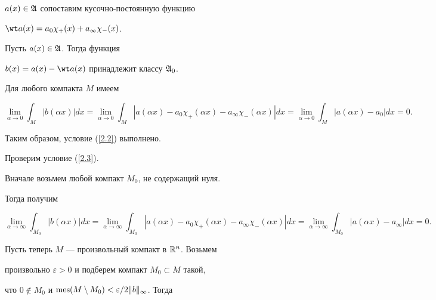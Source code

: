 $a(x)\in\frak A$ сопоставим кусочно-постоянную функцию


$\wt a(x)=a_0\chi_+(x)+a_\infty\chi_-(x)$.





\begin{lem}


Пусть $a(x)\in\frak A$. Тогда функция


$b(x)=a(x)-\wt a(x)$ принадлежит классу $\frak A_0$.


\end{lem}





\begin{pf}


Для любого компакта $M$ имеем


$$


\lim_{\alpha\to0} \int_M |b(\alpha x)|dx=


\lim_{\alpha\to0} \int_M


|a(\alpha x)-a_0\chi_+(\alpha x)-a_\infty\chi_-(\alpha x)|dx=


\lim_{\alpha\to0} \int_M |a(\alpha x)-a_0|dx=0.


$$


Таким образом, условие (\ref{2.2}) выполнено.





Проверим условие (\ref{2.3}).


Вначале возьмем любой компакт $M_0$, не содержащий нуля.


Тогда получим


$$


\lim_{\alpha\to\infty} \int_{M_0} |b(\alpha x)|dx=


\lim_{\alpha\to\infty} \int_{M_0}


|a(\alpha x)-a_0\chi_+(\alpha x)-a_\infty\chi_-(\alpha x)|dx=


\lim_{\alpha\to\infty} \int_{M_0}


|a(\alpha x)-a_\infty|dx=0.


$$


Пусть теперь $M$ --- произвольный компакт в $\Bbb R^n$. Возьмем


произвольно $\varepsilon>0$ и подберем компакт $M_0\subset M$ такой,


что $0\notin M_0$ и $\mes(M\setminus


M_0)<\varepsilon/2\|b\|_\infty$. Тогда


$$



\end{pf}
